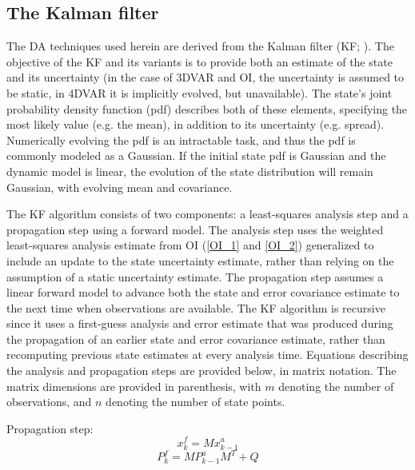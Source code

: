 \subsection{The Kalman filter}
\label{section_kf}
The DA techniques used herein are derived from the Kalman filter (KF; \citealt{kalman60,kalmanbucy61}). The objective of the KF and its variants is to provide both an estimate of the state and its uncertainty (in the case of 3DVAR and OI, the uncertainty is assumed to be static, in 4DVAR it is implicitly evolved, but unavailable). The state’s joint probability density function (pdf) describes both of these elements, specifying the most likely value (e.g. the mean), in addition to its uncertainty (e.g. spread). Numerically evolving the pdf is an intractable task, and thus the pdf is commonly modeled as a Gaussian. If the initial state pdf is Gaussian and the dynamic model is linear, the evolution of the state distribution will remain Gaussian, with evolving mean and covariance.

The KF algorithm consists of two components: a least-squares analysis step and a propagation step using a forward model. The analysis step uses the weighted least-squares analysis estimate from OI (\ref{OI_1} and \ref{OI_2}) generalized to include an update to the state uncertainty estimate, rather than relying on the assumption of a static uncertainty estimate. The propagation step assumes a linear forward model to advance both the state and error covariance estimate to the next time when observations are available. The KF algorithm is recursive since it uses a first-guess analysis and error estimate that was produced during the propagation of an earlier state and error covariance estimate, rather than recomputing previous state estimates at every analysis time. Equations describing the analysis and propagation steps are provided below, in matrix notation. The matrix dimensions are provided in parenthesis, with \(m\) denoting the number of observations, and \(n\) denoting the number of state points.

\noindent Propagation step:
\begin{equation}
   x_k^f = Mx_{k-1}^a
\label{OI1}
\end{equation}
\begin{equation}
\label{coveqn1}
   P_k^f = MP_{k-1}^{a}M^T + Q
\end{equation}

